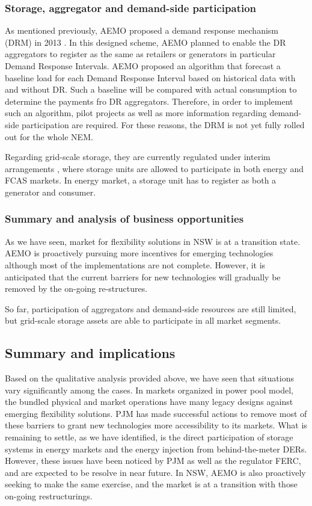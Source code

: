 \subsubsection{Storage, aggregator and demand-side participation}

As mentioned previously, AEMO proposed a demand response mechanism (DRM) in 2013 \cite{AEMO_DR_1}. In this designed scheme, AEMO planned to enable the DR aggregators to register as the same as retailers or generators in particular Demand Response Intervals. AEMO proposed an algorithm that forecast a baseline load for each Demand Response Interval  based on historical data with and without DR. Such a baseline will be compared with actual consumption to determine the payments fro DR aggregators. Therefore, in order to implement such an algorithm, pilot projects \cite{AEMO_DR_Pilot} as well as more information regarding demand-side participation \cite{AEMO_DR} are required. For these reasons, the DRM is not yet fully rolled out for the whole NEM.

Regarding grid-scale storage, they are currently regulated under interim arrangements \cite{AEMO_BESS}, where storage units are allowed to participate in both energy and FCAS markets. In energy market, a storage unit has to register as both a generator and consumer. 

\subsubsection{Summary and analysis of business opportunities}

As we have seen, market for flexibility solutions in NSW is at a transition state. AEMO is proactively pursuing more incentives for emerging technologies although most of the implementations are not complete. However, it is anticipated that the current barriers for new technologies will gradually be removed by the on-going re-structures.

So far, participation of aggregators and demand-side resources are still limited, but grid-scale storage assets are able to participate in all market segments.


\subsection{Summary and implications}

Based on the qualitative analysis provided above, we have seen that situations vary significantly among the cases. In markets organized in power pool model, the bundled physical and market operations have many legacy designs against emerging flexibility solutions. PJM has made successful actions to remove most of these barriers to grant new technologies more accessibility to its markets. What is remaining to settle, as we have identified, is the direct participation of storage systems in energy markets and the energy injection from behind-the-meter DERs. However, these issues have been noticed by PJM as well as the regulator FERC, and are expected to be resolve in near future. In NSW, AEMO is also proactively seeking to make the same exercise, and the market is at a transition with those on-going restructurings.

